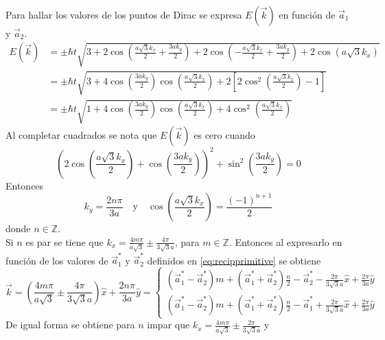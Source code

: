 \\Para hallar los valores de los puntos de Dirac se expresa $E(\vec{k})$ en función de $\vec{a}_1$ y $\vec{a}_2$.
\begin{align}
	\nonumber E(\vec{k}) & = \pm \hbar t \sqrt{3+2 \cos\left(\frac{a \sqrt{3}k_x}{2}+\frac{3ak_y}{2}\right)+2 \cos\left(-\frac{a \sqrt{3}k_x}{2}+\frac{3ak_y}{2}\right)+2 \cos\left(a \sqrt{3}k_x\right)} \\
	\nonumber            & = \pm \hbar t \sqrt{3+4 \cos\left(\frac{3ak_y}{2}\right) \cos\left(\frac{a\sqrt{3}k_x}{2}\right)+2\left[2 \cos^{2}\left(\frac{a \sqrt{3}k_x}{2}\right)-1\right]}               \\
	                     & = \pm \hbar t \sqrt{1+4 \cos\left(\frac{3ak_y}{2}\right) \cos\left(\frac{a\sqrt{3}k_x}{2}\right)+4 \cos^{2}\left(\frac{a \sqrt{3}k_x}{2}\right)}
\end{align}
Al completar cuadrados se nota que $E(\vec{k})$ es cero cuando
\begin{equation}
	\left(2 \cos\left(\frac{a\sqrt{3}k_x}{2}\right)+\cos\left(\frac{3ak_y}{2}\right)\right)^2+ \sin^2\left(\frac{3ak_y}{2}\right) = 0
\end{equation}
Entonces
\begin{equation}
	k_y = \frac{2n \pi}{3a}\quad \text{y}\quad\cos\left(\frac{a\sqrt{3}k_x}{2}\right)=\frac{\left(-1\right)^{n+1}}{2}
\end{equation}
donde $n \in \mathbb{Z}$.\\
Si $n$ es par se tiene que $k_x = \frac{4m\pi}{a\sqrt{3}}\pm \frac{4\pi}{3\sqrt{3}a}$, para $m \in \mathbb{Z}$. Entonces al expresarlo en función de los valores de $\vec{a}_1^{\ast}$ y $\vec{a}_2^{\ast}$ definidos en \eqref{eq:recipprimitive} se obtiene
\begin{equation}
	\vec{k} = \left(\frac{4m\pi}{a\sqrt{3}}\pm \frac{4\pi}{3\sqrt{3}a}\right)\hat{x} + \frac{2n\pi}{3a}\hat{y} = \begin{cases}
		(\vec{a}_1^{\ast} - \vec{a}_2^{\ast})m + (\vec{a}_1^{\ast} + \vec{a}_2^{\ast})\frac{n}{2}-\vec{a}_2^{\ast}- \frac{2\pi}{3\sqrt{3}a}\hat{x}+\frac{2\pi}{3a}\hat{y} \\
		(\vec{a}_1^{\ast} - \vec{a}_2^{\ast})m + (\vec{a}_1^{\ast} + \vec{a}_2^{\ast})\frac{n}{2}-\vec{a}_1^{\ast}+ \frac{2\pi}{3\sqrt{3}a}\hat{x}+\frac{2\pi}{3a}\hat{y}
	\end{cases}
\end{equation}
De igual forma se obtiene para $n$ impar que $k_x = \frac{4m\pi}{a\sqrt{3}}\pm \frac{2\pi}{3\sqrt{3}a}$ y
